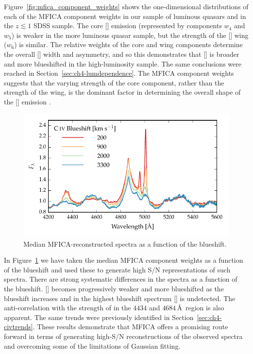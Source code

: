 Figure~\ref{fig:mfica_component_weights} shows the one-dimensional distributions of each of the MFICA component weights in our sample of luminous quasars and in the $z \lesssim 1$ SDSS sample. 
The core [] emission (represented by components $w_4$ and $w_5$) is weaker in the more luminous quasar sample, but the strength of the [] wing ($w_6$) is similar.
The relative weights of the core and wing components determine the overall [] width and asymmetry, and so this demonstrates that [] is broader and more blueshifted in the high-luminosity sample.
The same conclusions were reached in Section~\ref{sec:ch4-lumdependence}. 
The MFICA component weights suggests that the varying strength of the core component, rather than the strength of the wing, is the dominant factor in determining the overall shape of the [] emission \citep[e.g.][]{shen14}. 

\begin{figure}
    \centering
    \includegraphics[width=\columnwidth]{figures/chapter04/mfica_composites.pdf} 
    \caption[{Median MFICA-reconstructed spectra as a function of the  blueshift.}]{Median MFICA-reconstructed spectra as a function of the  blueshift.}     
    \label{fig:mfica_composites}
\end{figure}

In Figure~\ref{fig:mfica_composites} we have taken the median MFICA component weights as a function of the  blueshift and used these to generate high S/N representations of such spectra. 
There are strong systematic differences in the spectra as a function of the  blueshift. 
[] becomes progressively weaker and more blueshifted as the  blueshift increases and in the highest  blueshift spectrum [] is undetected. 
The anti-correlation with the strength of  in the $4434$ and $4684$\,\AA\, region is also apparent. 
The same trends were previously identified in Section~\ref{sec:ch4-civtrends}.
These results demonstrate that MFICA offers a promising route forward in terms of generating high-S/N reconstructions of the observed spectra and overcoming some of the limitations of Gaussian fitting.  

